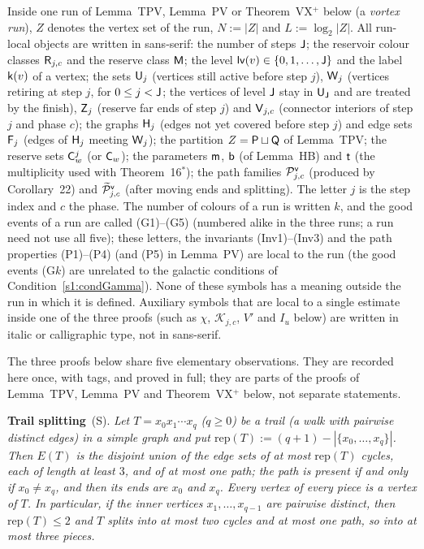 \begin{convention}\label{s4:convVortex}
Inside one run of Lemma~TPV, Lemma~PV or Theorem~VX$^+$ below (a \emph{vortex run}),
$Z$ denotes the vertex set of the run, $N:=|Z|$ and $L:=\log_2|Z|$. All run-local objects are written in sans-serif:
the number of steps $\mathsf{J}$; the reservoir colour classes $\mathsf{R}_{j,c}$ and the reserve class $\mathsf{M}$; the level $\mathsf{lv}(v)\in\{0,1,\dots,\mathsf{J}\}$
and the label $\mathsf{k}(v)$ of a vertex; the sets $\mathsf{U}_j$ (vertices still active before step $j$), $\mathsf{W}_j$ (vertices
retiring at step $j$, for $0\le j<\mathsf{J}$; the vertices of level $\mathsf{J}$ stay in $\mathsf{U}_{\mathsf{J}}$ and are treated by the
finish), $\mathsf{Z}_j$ (reserve far ends of step $j$) and $\mathsf{V}_{j,c}$ (connector interiors of step $j$ and
phase $c$); the graphs $\mathsf{H}_j$ (edges not yet covered before step $j$) and edge sets $\mathsf{F}_j$ (edges of $\mathsf{H}_j$ meeting
$\mathsf{W}_j$); the partition $Z=\mathsf{P}\sqcup\mathsf{Q}$ of Lemma~TPV; the reserve sets $\mathsf{C}^j_w$ (or $\mathsf{C}_w$); the parameters
$\mathsf{m}$, $\mathsf{b}$ (of Lemma~HB) and $\mathsf{t}$ (the multiplicity used with Theorem~16$^*$); the path families $\mathcal{P}^{\mathsf{v}}_{j,c}$
(produced by Corollary~22) and $\widetilde{\mathcal{P}}^{\mathsf{v}}_{j,c}$ (after moving ends and splitting). The letter $j$ is the step index
and $c$ the phase. The number of colours of a run is written $k$, and the good events of a run are called
(G1)--(G5) (numbered alike in the three runs; a run need not use all five); these letters, the invariants
(Inv1)--(Inv3) and the path properties (P1)--(P4) (and (P5) in Lemma~PV) are local to the run
(the good events (G$k$) are unrelated to the galactic conditions  of Condition~\ref{s1:condGamma}). None of
these symbols has a meaning outside the run in which it is defined. Auxiliary symbols that are local to a
single estimate inside one of the three proofs (such as $\chi$, $\mathcal K_{j,c}$, $V'$ and $I_u$ below) are
written in italic or calligraphic type, not in sans-serif.
\end{convention}


The three proofs below share five elementary observations. They are recorded here once, with tags, and proved in
full; they are parts of the proofs of Lemma~TPV, Lemma~PV and Theorem~VX$^+$ below, not
separate statements.

\smallskip\noindent\textbf{Trail splitting}~\textup{(S)}.
\emph{Let $T=x_0x_1\cdots x_q$ ($q\ge0$) be a trail (a walk with pairwise distinct edges) in a simple graph and put
$\mathrm{rep}(T):=(q+1)-|\{x_0,\dots,x_q\}|$. Then $E(T)$ is the disjoint union of the edge sets of at most $\mathrm{rep}(T)$ cycles,
each of length at least $3$, and of at most one path; the path is present if and only if $x_0\ne x_q$, and then its
ends are $x_0$ and $x_q$. Every vertex of every piece is a vertex of $T$. In particular, if the inner vertices
$x_1,\dots,x_{q-1}$ are pairwise distinct, then $\mathrm{rep}(T)\le2$ and $T$ splits into at most two cycles and at most one
path, so into at most three pieces.}

